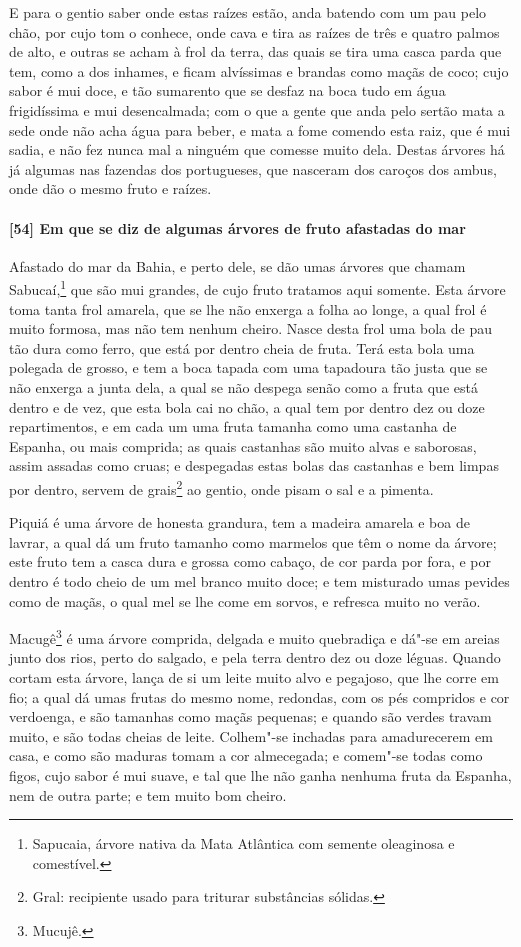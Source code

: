 \begin{linenumbers}
E para o gentio saber onde estas raízes estão, anda batendo com um pau pelo chão, por cujo
tom o conhece, onde cava e tira as raízes de três e quatro palmos de alto, e outras se
acham à frol da terra, das quais se tira uma casca parda que tem, como a dos inhames, e
ficam alvíssimas e brandas como maçãs de coco; cujo sabor é mui doce, e tão sumarento que
se desfaz na boca tudo em água frigidíssima e mui desencalmada; com o que a gente que anda
pelo sertão mata a sede onde não acha água para beber, e mata a fome comendo esta raiz,
que é mui sadia, e não fez nunca mal a ninguém que comesse muito dela. Destas árvores há
já algumas nas fazendas dos portugueses, que nasceram dos caroços dos ambus, onde dão o
mesmo fruto e raízes.

\paragraph{[54] Em que se diz de algumas árvores de fruto afastadas do mar}\quad
Afastado do mar da Bahia, e perto dele, se dão umas árvores que chamam Sabucaí,\footnote{
Sapucaia, árvore nativa da Mata Atlântica com semente oleaginosa e comestível.} que são
mui grandes, de cujo fruto tratamos aqui somente. Esta árvore toma tanta frol amarela, que
se lhe não enxerga a folha ao longe, a qual frol é muito formosa, mas não tem nenhum
cheiro. Nasce desta frol uma bola de pau tão dura como ferro, que está por dentro cheia de
fruta. Terá esta bola uma polegada de grosso, e tem a boca tapada com uma tapadoura tão
justa que se não enxerga a junta dela, a qual se não despega senão como a fruta que está
dentro e de vez, que esta bola cai no chão, a qual tem por dentro dez ou doze
repartimentos, e em cada um uma fruta tamanha como uma castanha de Espanha, ou mais
comprida; as quais castanhas são muito alvas e saborosas, assim assadas como cruas; e
despegadas estas bolas das castanhas e bem limpas por dentro, servem de grais\footnote{
Gral: recipiente usado para triturar substâncias sólidas.} ao gentio, onde pisam o sal e a
pimenta.

Piquiá é uma árvore de honesta grandura, tem a madeira amarela e boa de lavrar, a qual dá
um fruto tamanho como marmelos que têm o nome da árvore; este fruto tem a casca dura e
grossa como cabaço, de cor parda por fora, e por dentro é todo cheio de um mel branco
muito doce; e tem misturado umas pevides como de maçãs, o qual mel se lhe come em sorvos,
e refresca muito no verão.

Macugê\footnote{ Mucujê.} é uma árvore comprida, delgada e muito quebradiça e dá"-se em
areias junto dos rios, perto do salgado, e pela terra dentro dez ou doze léguas. Quando
cortam esta árvore, lança de si um leite muito alvo e pegajoso, que lhe corre em fio; a
qual dá umas frutas do mesmo nome, redondas, com os pés compridos e cor verdoenga, e são
tamanhas como maçãs pequenas; e quando são verdes travam muito, e são todas cheias de
leite. Colhem"-se inchadas para amadurecerem em casa, e como são maduras tomam a cor
almecegada; e comem"-se todas como figos, cujo sabor é mui suave, e tal que lhe não ganha
nenhuma fruta da Espanha, nem de outra parte; e tem muito bom cheiro.


\end{linenumbers}

